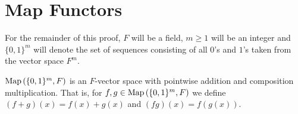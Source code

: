 \section{Map Functors}
For the remainder of this proof, \(F\) will be a field, \(m \ge 1\) will be an integer and \(\{0, 1\} ^{m}\) will denote the set of sequences consisting of all \(0\)'s and \(1\)'s taken from the vector space \(F^{m}\).
\begin{proposition}
	\(\operatorname{Map}\left( \{0, 1\} ^{m}, F \right) \) is an \(F\)-vector space with pointwise addition and composition multiplication. That is, for \(f, g \in \operatorname{Map} \left( \{0, 1\} ^{m}, F \right) \) we define \(\left( f + g \right) \left( x \right)  = f\left( x \right)  + g\left( x \right) \) and \(\left( fg \right) \left( x \right)  = f\left( g\left( x \right)  \right) \).
\end{proposition}

